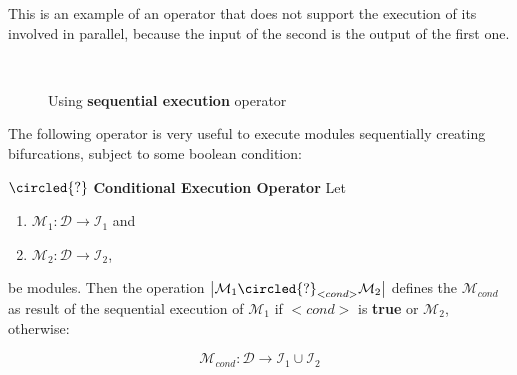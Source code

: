This is an example of an operator that does not support the execution of its involved \cms{} in parallel, because the input of the second \cm{} is the output of the first one.


\begin{figure}[h]
	\centering
	\hspace{0.05\linewidth}
	\\
	\caption[]{Using {\bf sequential execution} operator}
	\label{fig:seq_example}
\end{figure}

\separation

The following operator is very useful to execute modules sequentially creating bifurcations, subject to some boolean condition:

\begin{definition}\label{op:conditional}
$\circled{?}$ {\bf Conditional Execution Operator} Let
\begin{enumerate}%
	\item $\mathcal{M}_1 : \mathcal{D} \rightarrow \mathcal{I}_1$ and  
	\item $\mathcal{M}_2 : \mathcal{D} \rightarrow \mathcal{I}_2$,
\end{enumerate}%
be modules. %
Then the operation $\left|\mathcal{M}_1\circled{?}_{<cond>}\mathcal{M}_2\right|$ defines the \cm{} $\mathcal{M}_{cond}$ as result of the sequential execution of $\mathcal{M}_1$ if $<cond>$ is {\bf true} or $\mathcal{M}_2$, otherwise:

\[
\mathcal{M}_{cond}:\mathcal{D} \rightarrow \mathcal{I}_1 \cup \mathcal{I}_2 
\]
\end{definition}

